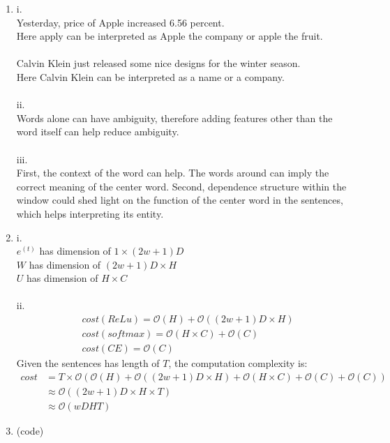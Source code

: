 \documentclass[10pt]{article}
\begin{document}
\begin{enumerate}[label=(\alph*)]
\item
i.\\
Yesterday, price of Apple increased 6.56 percent.\\
Here apply can be interpreted as Apple the company or apple the fruit.\\
\\
Calvin Klein just released some nice designs for the winter season.\\
Here Calvin Klein can be interpreted as a name or a company.\\
\\
ii.\\
Words alone can have ambiguity, therefore adding features other than the word itself can help reduce ambiguity.\\
\\
iii.\\
First, the context of the word can help. The words around can imply the correct meaning of the center word.
Second, dependence structure within the window could shed light on the function of the center word in the sentences, which helps interpreting its entity.

\item
i.\\
$e^{(t)}$ has dimension of $1 \times (2w+1)D$\\
$W$ has dimension of $(2w+1)D \times H$\\
$U$ has dimension of $H \times C$\\
\\
ii.\\
$$
\begin{aligned}
& cost(ReLu) = \mathcal{O}(H) + \mathcal{O}((2w+1)D \times H)\\
& cost(softmax) = \mathcal{O}(H \times C) + \mathcal{O}(C)\\
& cost(CE) = \mathcal{O}(C)
\end{aligned}
$$
Given the sentences has length of $T$, the computation complexity is:
$$
\begin{aligned}
cost
& = T \times \mathcal{O}(\mathcal{O}(H) + \mathcal{O}((2w+1)D \times H) + \mathcal{O}(H \times C) + \mathcal{O}(C) + \mathcal{O}(C))\\
& \approx \mathcal{O}((2w+1)D \times H \times T)\\
& \approx \mathcal{O}(wDHT)
\end{aligned}
$$

\item
(code)


\end{enumerate}
\end{document}
